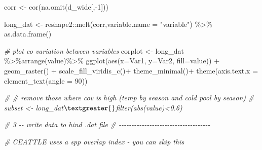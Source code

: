 \documentclass[
]{article}
\newenvironment{Shaded}{\begin{snugshade}}{\end{snugshade}}
\newcommand{\AttributeTok}[1]{\textcolor[rgb]{0.77,0.63,0.00}{#1}}
\newcommand{\CommentTok}[1]{\textcolor[rgb]{0.56,0.35,0.01}{\textit{#1}}}
\newcommand{\DecValTok}[1]{\textcolor[rgb]{0.00,0.00,0.81}{#1}}
\newcommand{\FunctionTok}[1]{\textcolor[rgb]{0.00,0.00,0.00}{#1}}
\newcommand{\NormalTok}[1]{#1}
\newcommand{\OtherTok}[1]{\textcolor[rgb]{0.56,0.35,0.01}{#1}}
\newcommand{\SpecialCharTok}[1]{\textcolor[rgb]{0.00,0.00,0.00}{#1}}
\newcommand{\StringTok}[1]{\textcolor[rgb]{0.31,0.60,0.02}{#1}}
\begin{document}
\begin{Shaded}
\begin{Highlighting}[]
\NormalTok{      corr     }\OtherTok{\textless{}{-}} \FunctionTok{cor}\NormalTok{(}\FunctionTok{na.omit}\NormalTok{(d\_wide[,}\SpecialCharTok{{-}}\DecValTok{1}\NormalTok{]))}
      
\NormalTok{      long\_dat }\OtherTok{\textless{}{-}}\NormalTok{ reshape2}\SpecialCharTok{::}\FunctionTok{melt}\NormalTok{(corr,}\AttributeTok{variable.name =} \StringTok{"variable"}\NormalTok{) }\SpecialCharTok{\%\textgreater{}\%} 
      \FunctionTok{as.data.frame}\NormalTok{() }
      
      \CommentTok{\# plot co variation between variables}
\NormalTok{      corplot }\OtherTok{\textless{}{-}}\NormalTok{ long\_dat }\SpecialCharTok{\%\textgreater{}\%}\FunctionTok{arrange}\NormalTok{(value)}\SpecialCharTok{\%\textgreater{}\%}
                    \FunctionTok{ggplot}\NormalTok{(}\FunctionTok{aes}\NormalTok{(}\AttributeTok{x=}\NormalTok{Var1, }\AttributeTok{y=}\NormalTok{Var2, }\AttributeTok{fill=}\NormalTok{value)) }\SpecialCharTok{+} 
                    \FunctionTok{geom\_raster}\NormalTok{() }\SpecialCharTok{+} 
                    \FunctionTok{scale\_fill\_viridis\_c}\NormalTok{()}\SpecialCharTok{+}
                    \FunctionTok{theme\_minimal}\NormalTok{()}\SpecialCharTok{+}
                    \FunctionTok{theme}\NormalTok{(}\AttributeTok{axis.text.x =} \FunctionTok{element\_text}\NormalTok{(}\AttributeTok{angle =} \DecValTok{90}\NormalTok{))}
      
      \CommentTok{\# \# remove those where cov is high (temp by season and cold pool by season)}
      \CommentTok{\# subset \textless{}{-} long\_dat$\textgreater{}$filter(abs(value)\textless{}0.6)}

   \CommentTok{\# 3 {-}{-} write data to hind .dat file}
   \CommentTok{\# {-}{-}{-}{-}{-}{-}{-}{-}{-}{-}{-}{-}{-}{-}{-}{-}{-}{-}{-}{-}{-}{-}{-}{-}{-}{-}{-}{-}{-}{-}{-}{-}{-}{-}{-}{-}}
      
         
      \CommentTok{\# CEATTLE uses a spp overlap index {-} you can skip this}
          

\end{Highlighting}
\end{Shaded}
\end{document}
